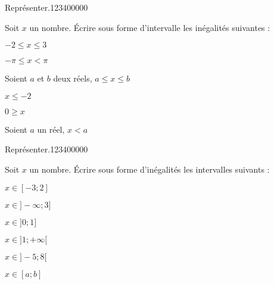 \begin{pageAD} 
 

 

  
\begin{ExoCad}{Représenter.}{1234}{0}{0}{0}{0}{0}

Soit $x$ un nombre. Écrire sous forme d'intervalle les inégalités suivantes :


\begin{enumerate}[leftmargin=*]
\begin{minipage}{0.49\linewidth}
	\item $-2 \leq x \leq 3$  
	\item $-\pi \leq x <  \pi$  
	\item Soient $a$ et $b$ deux réels, $a \leq x \leq  b$  
\end{minipage}
\hfill
\begin{minipage}{0.49\linewidth}
	\item $ x \leq -2$  
	\item $0 \geq x $  
	\item Soient $a$ un réel, $x <  a$  
\end{minipage}
\end{enumerate} 
\end{ExoCad}

  
\begin{ExoCad}{Représenter.}{1234}{0}{0}{0}{0}{0}

Soit $x$ un nombre. Écrire sous forme d'inégalités  les  intervalles suivants :

\begin{enumerate}[leftmargin=*]
\begin{minipage}{0.3\linewidth}
	\item $x \in [-3;2]$  
	\item $x \in ]-\infty;3]$  
\end{minipage}
\hfill
\begin{minipage}{0.3\linewidth}
	\item $x \in ]0;1]$  
	\item $x \in ]1;+\infty[$  
\end{minipage}
\hfill
\begin{minipage}{0.3\linewidth}
	\item $x \in ]-5;8[$  
	\item $x \in [a;b]$  
\end{minipage}
\end{enumerate} 
\end{ExoCad}




\end{pageAD}

